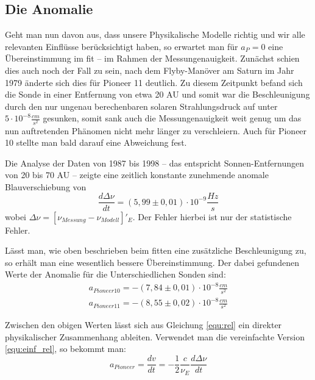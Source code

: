 
\subsection{Die Anomalie}
Geht man nun davon aus, dass unsere Physikalische Modelle richtig und wir alle relevanten Einflüsse berücksichtigt haben, so erwartet man für $a_P = 0$ eine Übereinstimmung im fit – im Rahmen der Messungenauigkeit.
Zunächst schien dies auch noch der Fall zu sein, nach dem Flyby-Manöver am Saturn im Jahr 1979 änderte sich dies für Pioneer 11 deutlich. Zu diesem Zeitpunkt befand sich die Sonde in einer Entfernung von etwa 20 AU und somit war die Beschleunigung durch den nur ungenau berechenbaren solaren Strahlungsdruck auf unter $5 \cdot 10^{-8} \frac{cm}{s^2}$ gesunken, %
somit sank auch die Messungenauigkeit weit genug um das nun auftretenden Phänomen nicht mehr länger zu verschleiern.
Auch für Pioneer 10 stellte man bald darauf eine Abweichung fest.

Die Analyse der Daten von 1987 bis 1998 – das entspricht Sonnen-Entfernungen von 20 bis 70 AU –
zeigte eine zeitlich konstante zunehmende anomale Blauverschiebung von
\begin{equation}
  \frac{d\Delta\nu}{dt}=(5,99\pm0,01)\cdot10^{-9}\frac{Hz}{s}
\end{equation}
wobei $\Delta\nu=[\nu_{Messung}-\nu_{Modell}]'_E$.\cite{Dittus2006} Der Fehler hierbei ist nur der statistische Fehler.

Lässt man, wie oben beschrieben beim fitten eine zusätzliche Beschleunigung zu, so erhält man eine wesentlich bessere Übereinstimmung. Der dabei gefundenen Werte der Anomalie für die Unterschiedlichen Sonden sind:
\begin{eqnarray}
  a_{Pioneer 10} = -(7,84\pm0,01)\cdot10^{-8}\frac{cm}{s^2} \\  
  a_{Pioneer 11} = -(8,55\pm0,02)\cdot10^{-8}\frac{cm}{s^2}
\end{eqnarray}

Zwischen den obigen Werten lässt sich aus Gleichung \ref{equ:rel} ein direkter physikalischer Zusammenhang ableiten. Verwendet man die vereinfachte Version \ref{equ:einf_rel}, so bekommt man:
\begin{equation}
  a_{Pioneer}=\frac{dv}{dt}=-\frac{1}{2}\frac{c}{\nu_E}\frac{d\Delta\nu}{dt}
\end{equation}

